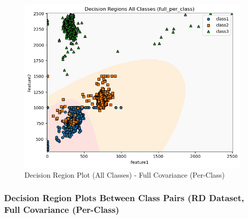 \begin{figure}[H]
    \centering
    \includegraphics[width=0.85\linewidth]{images/RD_Group04_images/04_full_per_class/05_decision_region_all.png}
    \caption{Decision Region Plot (All Classes) - Full Covariance (Per-Class)}
\end{figure}

\subsubsection{Decision Region Plots Between Class Pairs (RD Dataset, Full Covariance (Per-Class)}

